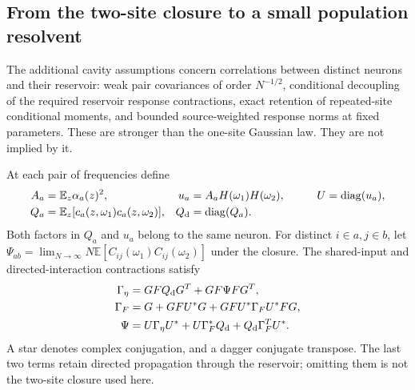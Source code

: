 \subsection{From the two-site closure to a small population resolvent}

The additional cavity assumptions concern correlations between distinct
neurons and their reservoir: weak pair covariances of order $N^{-1/2}$,
conditional decoupling of the required reservoir response contractions, exact
retention of repeated-site conditional moments, and bounded source-weighted
response norms at fixed parameters. These are stronger than the one-site
Gaussian law. They are not implied by it.

At each pair of frequencies define
\begin{equation}
 \begin{aligned}
 A_a&=\mathbb E_z\alpha_a(z)^2,\qquad
 &u_a&=A_aH(\omega_1)H(\omega_2),\qquad
 &U&=\operatorname{diag}(u_a),\\
 Q_a&=\mathbb E_z[c_a(z,\omega_1)c_a(z,\omega_2)],
 &Q_{\rm d}&=\operatorname{diag}(Q_a).
 \end{aligned}
 \label{eq:an_AUQ}
\end{equation}
Both factors in $Q_a$ and $u_a$ belong to the same neuron. For distinct
$i\in a,j\in b$, let
$\Psi_{ab}=\lim_{N\to\infty}N\mathbb E[C_{ij}(\omega_1)C_{ij}(\omega_2)]$
under the closure. The shared-input and directed-interaction contractions
satisfy
\begin{align}
 \Gamma_\eta&=GFQ_{\rm d}G^T+GF\Psi FG^T,\\
 \Gamma_F&=G+GFU^*G+GFU^*\Gamma_FU^*FG,\\
 \Psi&=U\Gamma_\eta U^*+U\Gamma_F^*Q_{\rm d}
                   +Q_{\rm d}\Gamma_F^TU^*.
 \label{eq:an_cavity}
\end{align}
A star denotes complex conjugation, and a dagger conjugate transpose. The
last two terms retain directed propagation through the reservoir; omitting
them is not the two-site closure used here.

